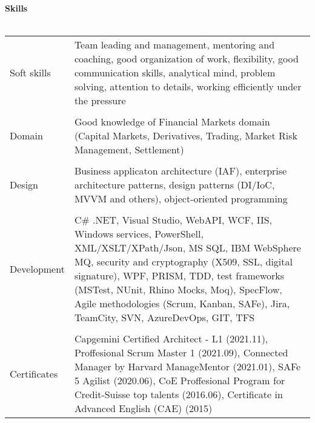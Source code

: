 \textbf{Skills}
\\
\\
\begin{tabular}{p{}|p{}}
Soft skills
& Team leading and management, mentoring and coaching, good organization of work, flexibility, good communication skills, analytical mind, problem solving, attention to details, working efficiently under the pressure \\
& \\
Domain
& Good knowledge of Financial Markets domain (Capital Markets, Derivatives, Trading, Market Risk Management, Settlement)\\
& \\
Design
& Business applicaton architecture (IAF), enterprise architecture patterns, design patterns (DI/IoC, MVVM and others), object-oriented programming \\
& \\
Development
& C\# .NET, Visual Studio, WebAPI, WCF, IIS, Windows services, PowerShell, XML/XSLT/XPath/Json, MS SQL, IBM WebSphere MQ, security and cryptography (X509, SSL, digital signature), WPF, PRISM, TDD, test frameworks (MSTest, NUnit, Rhino Mocks, Moq), SpecFlow, Agile methodologies (Scrum, Kanban, SAFe), Jira, TeamCity, SVN, AzureDevOps, GIT, TFS \\
& \\
Certificates
& Capgemini Certified Architect - L1 (2021.11), Proffesional Scrum Master 1 (2021.09), Connected Manager by Harvard ManageMentor (2021.01), SAFe 5 Agilist (2020.06), CoE Proffesional Program for Credit-Suisse top talents (2016.06), Certificate in Advanced English (CAE) (2015) \\
\end{tabular}